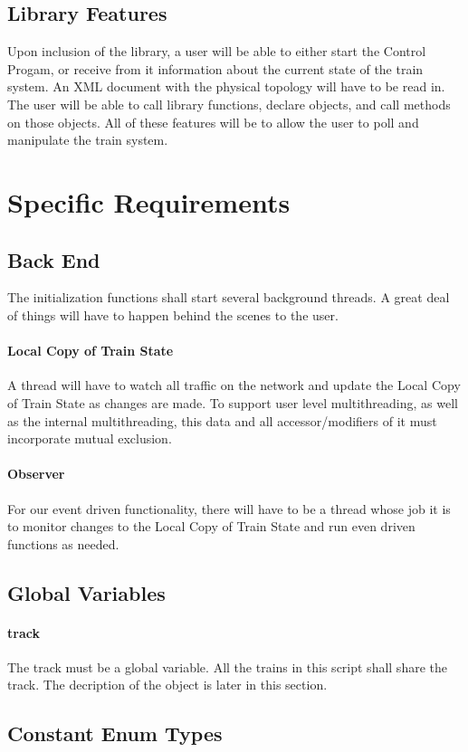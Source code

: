 \documentclass[a4paper,11pt,notitlepage]{article}
\def\CS{Control Progam\xspace} \def\LC{Local Copy of Train State\xspace} \def\TN{Track Node\xspace}
\begin{document}
\subsection{Library Features}
Upon inclusion of the library, a user will be able to either start the \CS, or receive from it information about the current state of the train system. An XML document with the physical topology will have to be read in. The user will be able to call library functions, declare objects, and call methods on those objects. All of these features will be to allow the user to poll and manipulate the train system.

\newpage
\section{Specific Requirements}
\subsection{Back End}
The initialization functions shall start several background threads. A great deal of things will have to happen behind the scenes to the user.
\paragraph{\LC} A thread will have to watch all traffic on the network and update the \LC as changes are made. To support user level multithreading, as well as the internal multithreading, this data and all accessor/modifiers of it must incorporate mutual exclusion.
\paragraph{Observer} For our event driven functionality, there will have to be a thread whose job it is to monitor changes to the \LC and run even driven functions as needed.
\subsection{Global Variables}
\paragraph{track} The track must be a global variable. All the trains in this script shall share the track. The decription of the object is later in this section.
\subsection{Constant Enum Types}
\end{document}
